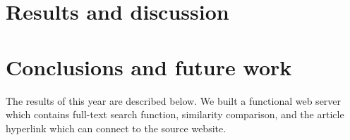 \documentclass[a4paper,twocolumn,twoside]{article}
\begin{document}
	

	
	\section{Results and discussion}


	\section{Conclusions and future work}
    The results of this year are described below. We built a functional web server which contains full-text search function, similarity comparison, and the article hyperlink which can connect to the source website.
		
	
	\clearpage 
\end{document}
